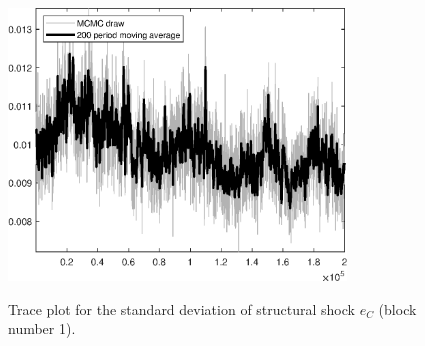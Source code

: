 \begin{figure}[H]
\centering
  \includegraphics[width=0.8\textwidth]{RBC_growth/graphs/TracePlot_SE_e_C_blck_1}\\
    \caption{Trace plot for the standard deviation of structural shock ${e_C}$ (block number 1).}
\end{figure}
